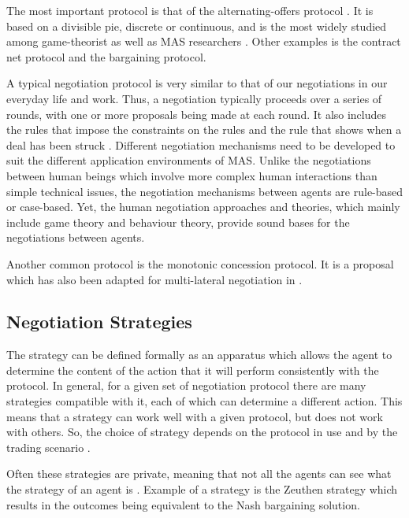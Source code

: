 The most important protocol is that of the alternating-offers protocol \citep{rubinstein1982perfect} . It is based on a divisible pie, discrete or continuous, and is the most widely studied among game-theorist as well as MAS researchers \citep{fatima2014principles}. Other examples is the contract net protocol and the bargaining protocol. 

A typical negotiation protocol is very similar to that of our negotiations in our everyday life and work. Thus, a negotiation typically proceeds over a series of rounds, with one or more proposals being made at each round. It also includes the rules that impose the constraints on the rules and the rule that shows when a deal has been struck \citep{fatima2014principles}. Different negotiation mechanisms need to be developed to suit the different application environments of MAS. Unlike the negotiations between human beings which involve more complex human interactions than simple technical issues, the negotiation mechanisms between agents are rule-based or case-based. Yet, the human negotiation approaches and theories, which mainly include game theory and behaviour theory, provide sound bases for the negotiations between agents. 

Another common protocol is the monotonic concession protocol. It is a proposal which has also been adapted for multi-lateral negotiation in \citep{endriss2006monotonic}.



\subsection{Negotiation Strategies}
The strategy can be defined formally as an apparatus which allows the agent to determine the content of the action that it will perform consistently with the protocol. In general, for a given set of negotiation protocol there are many strategies compatible with it, each of which can determine a different action. This means that a strategy can work well with a given protocol, but does not work with others. So, the choice of strategy depends on the protocol in use and by the trading scenario \citep{di2015multi}.

Often these strategies are private, meaning that not all the agents can see what the strategy of an agent is \citep{fatima2004agenda}. Example of a strategy is the Zeuthen strategy which results in the outcomes being equivalent to the Nash bargaining solution. 


